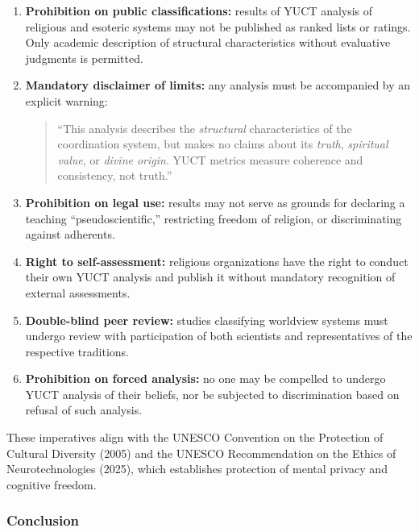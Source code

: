 \documentclass[12pt,a4paper]{article}
\begin{document}
	\begin{enumerate}[label=(\arabic*)]
		\item \textbf{Prohibition on public classifications:} results of YUCT analysis of religious and esoteric systems may not be published as ranked lists or ratings. Only academic description of structural characteristics without evaluative judgments is permitted.
		
		\item \textbf{Mandatory disclaimer of limits:} any analysis must be accompanied by an explicit warning:
		\begin{quote}
			``This analysis describes the \emph{structural} characteristics of the coordination system, but makes no claims about its \emph{truth}, \emph{spiritual value}, or \emph{divine origin}. YUCT metrics measure coherence and consistency, not truth.''
		\end{quote}
		
		\item \textbf{Prohibition on legal use:} results may not serve as grounds for declaring a teaching ``pseudoscientific,'' restricting freedom of religion, or discriminating against adherents.
		
		\item \textbf{Right to self-assessment:} religious organizations have the right to conduct their own YUCT analysis and publish it without mandatory recognition of external assessments.
		
		\item \textbf{Double-blind peer review:} studies classifying worldview systems must undergo review with participation of both scientists and representatives of the respective traditions.
		
		\item \textbf{Prohibition on forced analysis:} no one may be compelled to undergo YUCT analysis of their beliefs, nor be subjected to discrimination based on refusal of such analysis.
	\end{enumerate}
	
	These imperatives align with the UNESCO Convention on the Protection of Cultural Diversity (2005) and the UNESCO Recommendation on the Ethics of Neurotechnologies (2025), which establishes protection of mental privacy and cognitive freedom.
	
	\subsubsection{Conclusion}
	
\end{document}
